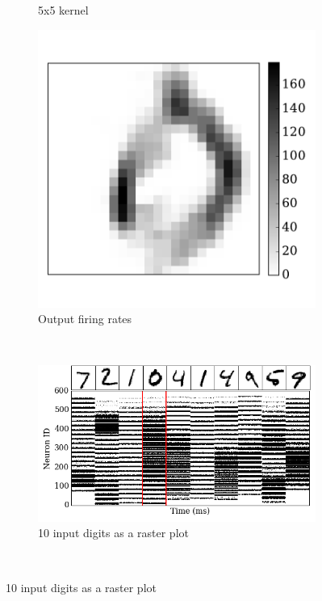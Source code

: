 \begin{figure}[bt!]
\begin{subfigure}[t]{0.3\textwidth}
		    \caption{5x5 kernel}
		    \label{Fig:63}
		\end{subfigure}
		\begin{subfigure}[t]{0.3\textwidth}
			\includegraphics[width=\textwidth]{pics_iconip/6-4.pdf}
		    \caption{Output firing rates}
		    \label{Fig:64}
		\end{subfigure}
		\\
		\begin{subfigure}[t]{0.7\textwidth}
			\includegraphics[width=\textwidth]{pics_iconip/6-1.png}
		    \caption{10 input digits as a raster plot}
		    \label{Fig:61}
		\end{subfigure}\\

\end{figure}
